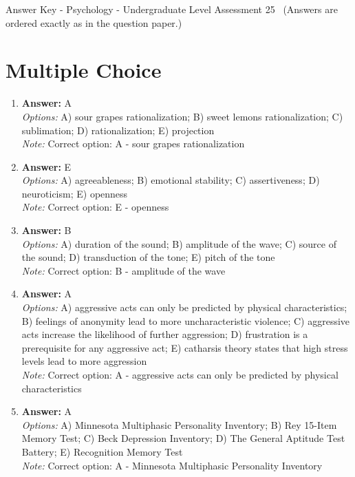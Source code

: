 \documentclass[12pt]{article}
\begin{document}
\begin{center}
Answer Key - Psychology - Undergraduate Level Assessment 25 \
\small (Answers are ordered exactly as in the question paper.)
\end{center}

\section*{Multiple Choice}
\begin{enumerate}[label=\arabic*.]
\item \textbf{Answer:} A
\\ \textit{Options:} A) sour grapes rationalization; B) sweet lemons rationalization; C) sublimation; D) rationalization; E) projection
\\ \textit{Note:} Correct option: A - sour grapes rationalization
\item \textbf{Answer:} E
\\ \textit{Options:} A) agreeableness; B) emotional stability; C) assertiveness; D) neuroticism; E) openness
\\ \textit{Note:} Correct option: E - openness
\item \textbf{Answer:} B
\\ \textit{Options:} A) duration of the sound; B) amplitude of the wave; C) source of the sound; D) transduction of the tone; E) pitch of the tone
\\ \textit{Note:} Correct option: B - amplitude of the wave
\item \textbf{Answer:} A
\\ \textit{Options:} A) aggressive acts can only be predicted by physical characteristics; B) feelings of anonymity lead to more uncharacteristic violence; C) aggressive acts increase the likelihood of further aggression; D) frustration is a prerequisite for any aggressive act; E) catharsis theory states that high stress levels lead to more aggression
\\ \textit{Note:} Correct option: A - aggressive acts can only be predicted by physical characteristics
\item \textbf{Answer:} A
\\ \textit{Options:} A) Minnesota Multiphasic Personality Inventory; B) Rey 15-Item Memory Test; C) Beck Depression Inventory; D) The General Aptitude Test Battery; E) Recognition Memory Test
\\ \textit{Note:} Correct option: A - Minnesota Multiphasic Personality Inventory
\end{enumerate}
\end{document}
